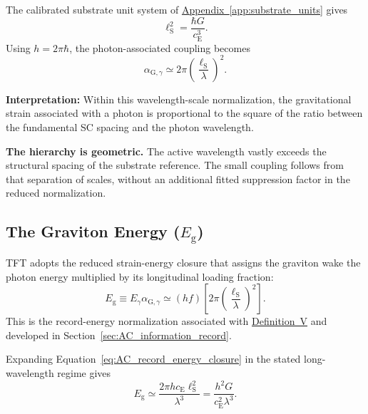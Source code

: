 The calibrated substrate unit system of \hyperref[app:substrate_units]{Appendix~\ref*{app:substrate_units}} gives
\begin{equation}
    \ell_{\mathrm S}^{2}
    =\frac{\hbar G}{c_{\mathrm E}^{3}}.
    \label{eq:AC_substrate_spacing}
\end{equation}
Using $h=2\pi\hbar$, the photon-associated coupling becomes
\begin{equation}
    \alpha_{\mathrm G,\gamma}
    \simeq2\pi\left(\frac{\ell_{\mathrm S}}{\lambda}\right)^{2}.
    \label{eq:AC_geometric_hierarchy}
\end{equation}

\noindent\textbf{Interpretation:}
Within this wavelength-scale normalization, the gravitational strain associated with a photon is proportional to the square of the ratio between the fundamental SC spacing and the photon wavelength.

\noindent\textbf{The hierarchy is geometric.}
The active wavelength vastly exceeds the structural spacing of the substrate reference. The small coupling follows from that separation of scales, without an additional fitted suppression factor in the reduced normalization.

\subsection[The Graviton Energy (Eg)]{The Graviton Energy ($E_{\mathrm g}$)}

TFT adopts the reduced strain-energy closure that assigns the graviton wake the photon energy multiplied by its longitudinal loading fraction:
\begin{equation}
    E_{\mathrm g}
    \equiv E_\gamma\alpha_{\mathrm G,\gamma}
    \simeq(hf)\left[
    2\pi\left(\frac{\ell_{\mathrm S}}{\lambda}\right)^{2}
    \right].
    \label{eq:AC_record_energy_closure}
\end{equation}
This is the record-energy normalization associated with \hyperref[def:definition_five]{Definition~V} and developed in Section~\ref{sec:AC_information_record}.

Expanding Equation~\eqref{eq:AC_record_energy_closure} in the stated long-wavelength regime gives
\begin{equation}
    E_{\mathrm g}
    \simeq\frac{2\pi h c_{\mathrm E}\ell_{\mathrm S}^{2}}{\lambda^{3}}
    =\frac{h^{2}G}{c_{\mathrm E}^{2}\lambda^{3}}.
    \label{eq:AC_graviton_energy_scale}
\end{equation}

